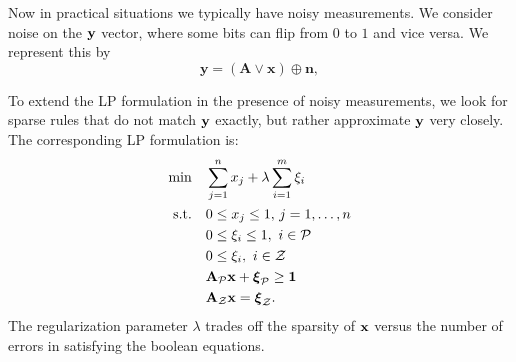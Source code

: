 Now in practical situations we typically have noisy measurements. 
We consider noise on the $\mathbf{y}$ vector, where some bits can flip from 
$0$ to $1$ and vice versa. We represent this by 
\begin{equation}
\label{eq:noisyforwardtest}
	\mathbf{y} = (\mathbf{A} \lor \mathbf{x}) \oplus \mathbf{n},
\end{equation}

To extend the LP formulation in the presence of noisy measurements, we look
for sparse rules that do not match $\mathbf{y}$ exactly, but rather approximate 
$\mathbf{y}$ very closely. The corresponding LP formulation is:
\begin{align}
\label{eq:booleanl1minLPslack}
	\min\quad &\sum_{j=1}^{n} x_j + \lambda\sum_{i=1}^{m}\xi_i\\
	\textrm{s.t.\quad} & 0 \le x_j \le 1,\,j = 1,\ldots,n\nonumber\\
		& 0 \le \xi_i \le 1, ~i \in \mathcal{P} \nonumber\\
		& 0 \le \xi_i, ~i \in \mathcal{Z}\nonumber\\
		& \mathbf{A}_{\mathcal{P}}\mathbf{x} + \boldsymbol{\xi}_{\mathcal{P}} \ge \mathbf{1}\nonumber\\
		& \mathbf{A}_{\mathcal{Z}}\mathbf{x} = \boldsymbol{\xi}_{\mathcal{Z}}.\nonumber
\end{align}
The regularization parameter $\lambda$ trades off the sparsity of $\mathbf{x}$ versus
the number of errors in satisfying the boolean equations.



